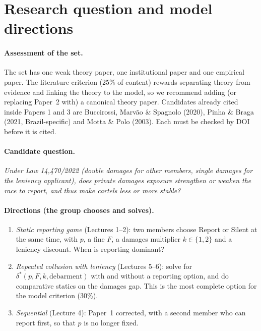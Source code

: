 \documentclass[11pt,a4paper]{article}
\begin{document}
\section{Research question and model directions}\label{sec:model}

\paragraph{Assessment of the set.} The set has one weak theory paper, one institutional paper and
one empirical paper. The literature criterion (25\% of content) rewards separating theory from
evidence and linking the theory to the model, so we recommend adding (or replacing Paper~2 with)
a canonical theory paper. Candidates already cited inside Papers 1 and 3 are Buccirossi, Marvão
\& Spagnolo (2020), Pinha \& Braga (2021, Brazil-specific) and Motta \& Polo (2003). Each must be
checked by DOI before it is cited.

\paragraph{Candidate question.} \emph{Under Law 14,470/2022 (double damages for other members,
single damages for the leniency applicant), does private damages exposure strengthen or weaken the
race to report, and thus make cartels less or more stable?}

\paragraph{Directions (the group chooses and solves).}
\begin{enumerate}[label=\Alph*.]
\item \emph{Static reporting game} (Lectures 1--2): two members choose Report or Silent at the
same time, with $p$, a fine $F$, a damages multiplier $k\in\{1,2\}$ and a leniency discount.
When is reporting dominant?
\item \emph{Repeated collusion with leniency} (Lectures 5--6): solve for
$\delta^*(p,F,k,\text{debarment})$ with and without a reporting option, and do comparative statics
on the damages gap. This is the most complete option for the model criterion (30\%).
\item \emph{Sequential} (Lecture 4): Paper~1 corrected, with a second member who can report first,
so that $p$ is no longer fixed.
\end{enumerate}
\end{document}
